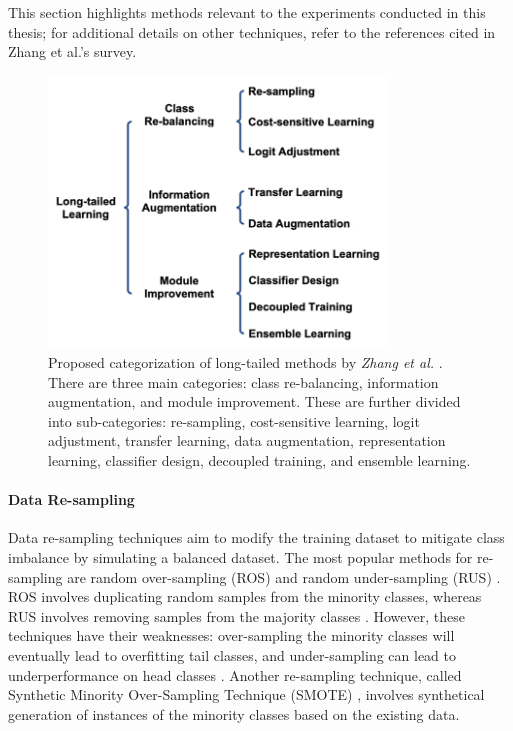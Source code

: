 This section highlights methods relevant to the experiments conducted in this thesis; for additional details on other techniques, refer to the references cited in Zhang et al.'s survey.

\begin{figure}[ht]
    \centering
    \includegraphics[width=0.8\textwidth]{Images/lt_methods_categories.png} 
    \caption{Proposed categorization of long-tailed methods by \emph{Zhang et al.} \cite{zhang2023deep}. There are three main categories: class re-balancing, information augmentation, and module improvement. These are further divided into sub-categories: re-sampling, cost-sensitive learning, logit adjustment, transfer learning, data augmentation, representation learning, classifier design, decoupled training, and ensemble learning.}
    \label{fig:lt_methods} 
\end{figure}


\paragraph{Data Re-sampling}
Data re-sampling techniques aim to modify the training dataset to mitigate class imbalance by simulating a balanced dataset. The most popular methods for re-sampling are random over-sampling (ROS) and random under-sampling (RUS) \cite{Chawla_2002}. ROS involves duplicating random samples from the minority classes, whereas RUS involves removing samples from the majority classes \cite{zhang2023deep}. However, these techniques have their weaknesses: over-sampling the minority classes will eventually lead to overfitting tail classes, and under-sampling can lead to underperformance on head classes \cite{zhang2023deep}. Another re-sampling technique, called Synthetic Minority Over-Sampling Technique (SMOTE) \cite{Chawla_2002}, involves synthetical generation of instances of the minority classes based on the existing data. 

